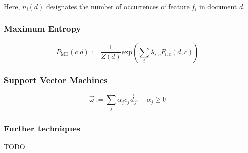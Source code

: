 Here, $n_i(d)$ designates the number of occurrences of feature $f_i$ in document $d$.

\subsubsection*{Maximum Entropy}

\begin{equation*}
P_{\mathrm{ME}}(c \vert d) := \frac{1}{Z(d)}\mathrm{exp}\left( \sum_{i} \lambda_{i,c} F_{i,c}(d,c) \right)
\end{equation*}

\subsubsection*{Support Vector Machines}

\begin{equation*}
\vec{\omega} := \sum_j \alpha_j c_j \vec{d}_j,\quad \alpha_j \geq 0
\end{equation*}

\subsubsection*{Further techniques}

TODO